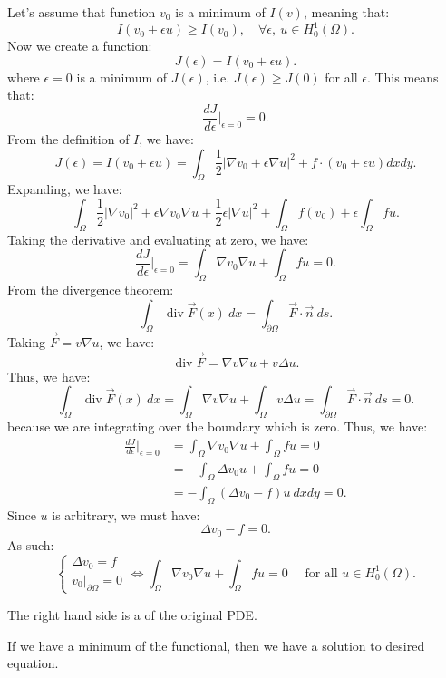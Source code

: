 \documentclass[../main/main.tex]{subfiles}
\begin{document}
Let's assume that function $ v_0$ is a minimum of $I(v)$, meaning that: \[
    I(v_0 + \epsilon u) \ge  I(v_0), \quad \forall  \epsilon,~ u\in H^1_0(\Omega)
.\] Now we create a function: \[
J(\epsilon) = I(v_0 + \epsilon u) 
.\] where $\epsilon=0$ is a minimum of $J(\epsilon)$, i.e.  $J(\epsilon) \ge  J(0)$ for all $\epsilon$. This means that:  \[
\frac{dJ}{d\epsilon} \bigg\rvert_{\epsilon = 0} = 0
.\] From the definition of $I$, we have: \[
J(\epsilon) = I(v_0+\epsilon u) = \int_{\Omega} \frac{1}{2}|\nabla v_0 + \epsilon \nabla u|^2 + f\cdot (v_0 + \epsilon u) dx dy
.\] Expanding, we have: \[
\int_{\Omega} \frac{1}{2}|\nabla v_0|^2 + \epsilon \nabla v_0 \nabla  u + \frac{1}{2}\epsilon |\nabla u|^2 + \int_{\Omega} f(v_0) + \epsilon  \int_{\Omega}fu
.\]
Taking the derivative and evaluating at zero, we have: \[
\frac{dJ}{d\epsilon}\bigg\rvert_{\epsilon = 0} = \int_{\Omega}  \nabla v_0 \nabla  u + \int_{\Omega} f u = 0
.\]
From the divergence theorem: \[
    \int_{\Omega} \operatorname{div}\vec{F}(x)~dx = \int_{\partial\Omega} \vec{F}\cdot \vec{n}~ds
.\] Taking $\vec{F} = v \nabla u $, we have: \[
\operatorname{div} \vec{F} = \nabla  v \nabla  u + v \Delta u
.\] Thus, we have: \[
    \int_{\Omega} \operatorname{div}\vec{F}(x)~dx = \int_{\Omega}\nabla v \nabla u + \int_{\Omega} v \Delta u =  \int_{\partial\Omega} \vec{F}\cdot \vec{n}~ds = 0 
.\] because we are integrating over the boundary which is zero. Thus, we have: 
\begin{align*} 
\frac{dJ}{d\epsilon}\bigg\rvert_{\epsilon = 0} &= \int_{\Omega}  \nabla v_0 \nabla  u + \int_{\Omega} f u = 0\\ 
&= -\int_{\Omega} \Delta v_0  u + \int_{\Omega} fu = 0 \\
&= -\int_{\Omega} (\Delta v_0 -f) u~dxdy  = 0 
.\end{align*}
Since $u$ is arbitrary, we must have:  \[
\Delta v_0-f = 0
.\] As such: \[
\begin{cases}
    \Delta v_0 = f \\
v_0 \big\rvert_{\partial \Omega} = 0
\end{cases} \iff \int_{\Omega} \nabla v_0 \nabla u + \int_{\Omega} fu = 0\quad \text{ for all $u \in  H^1_0 (\Omega)$}
.\] 
\begin{definition}
    The right hand side is a  of the original PDE.
\end{definition}
\begin{remark}
    If we have a minimum of the functional, then we have a solution to desired equation.
\end{remark}
\end{document}
